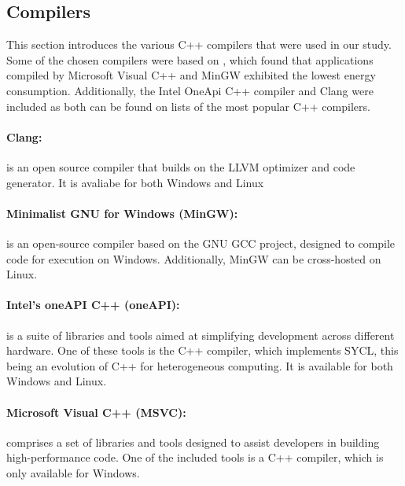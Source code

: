 \subsection{Compilers}

This section introduces the various C++ compilers that were used in our study. Some of the chosen compilers were based on \cite{hassan2017}, which found that applications compiled by Microsoft Visual C++ and MinGW exhibited the lowest energy consumption. Additionally, the Intel OneApi C++ compiler and Clang were included as both can be found on lists of the most popular C++ compilers\cite{mycplus, educba, softwaretestinghelp}. 



\paragraph{Clang:} is an open source compiler that builds on the LLVM optimizer and code generator. It is avaliabe for both Windows and Linux\cite{clang}

\paragraph*{Minimalist GNU for Windows (MinGW):} is an open-source compiler based on the GNU GCC project, designed to compile code for execution on Windows. Additionally, MinGW can be cross-hosted on Linux.\cite{mingw}

\paragraph*{Intel's oneAPI C++ (oneAPI):} is a suite of libraries and tools aimed at simplifying development across different hardware. One of these tools is the C++ compiler, which implements SYCL, this being an evolution of C++ for heterogeneous computing. It is available for both Windows and Linux.\cite{oneapi}

\paragraph*{Microsoft Visual C++ (MSVC):}  comprises a set of libraries and tools designed to assist developers in building high-performance code. One of the included tools is a C++ compiler, which is only available for Windows\cite{msvc}.